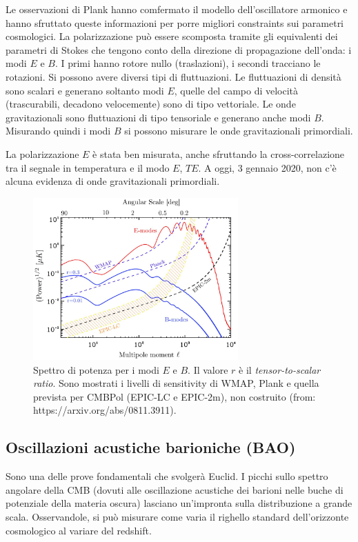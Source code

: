 Le osservazioni di Plank hanno comfermato il modello dell'oscillatore armonico e hanno sfruttato queste informazioni per porre migliori constraints sui parametri cosmologici. La polarizzazione può essere scomposta tramite gli equivalenti dei parametri di Stokes che tengono conto della direzione di propagazione dell'onda: i modi $E$ e $B$. I primi hanno rotore nullo (traslazioni), i secondi tracciano le rotazioni. Si possono avere diversi tipi di fluttuazioni. Le fluttuazioni di densità sono scalari e generano soltanto modi $E$, quelle del campo di velocità (trascurabili, decadono  velocemente) sono di tipo vettoriale. Le onde gravitazionali sono fluttuazioni di tipo tensoriale e generano anche modi $B$. Misurando quindi i modi $B$ si possono misurare le onde gravitazionali primordiali. 

La polarizzazione $E$ è stata ben misurata, anche sfruttando la cross-correlazione tra il segnale in temperatura e il modo $E$, $TE$. A oggi, 3 gennaio 2020, non c'è alcuna evidenza di onde gravitazionali primordiali. 


\begin{figure}[H]
    \centering
    \includegraphics[width=0.7\textwidth]{Pictures/11/eb.jpg}
    \caption{Spettro di potenza per i modi $E$ e $B$. Il valore $r$ è il \textit{tensor-to-scalar ratio}. Sono mostrati i livelli di sensitivity di WMAP, Plank e quella prevista per CMBPol (EPIC-LC e EPIC-2m), non costruito (from: https://arxiv.org/abs/0811.3911).}
\end{figure}




\subsection{Oscillazioni acustiche barioniche (BAO)}
Sono una delle prove fondamentali che svolgerà Euclid. I picchi sullo spettro angolare della CMB (dovuti alle oscillazione acustiche dei barioni nelle buche di potenziale della materia oscura) lasciano un'impronta sulla distribuzione a grande scala. Osservandole, si può misurare come varia il righello standard dell'orizzonte cosmologico al variare del redshift. 


